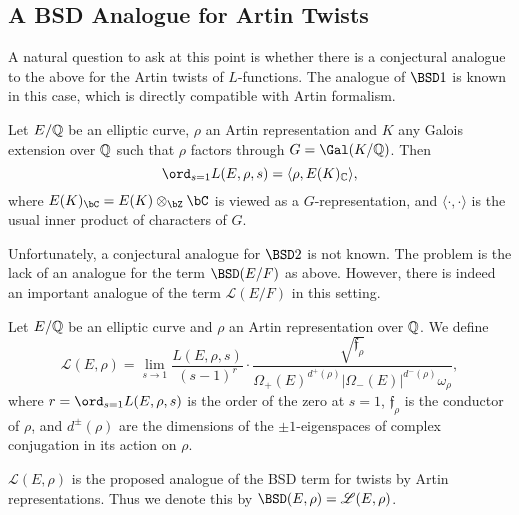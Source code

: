 \subsection{A BSD Analogue for Artin Twists}

A natural question to ask at this point is whether there is a conjectural analogue to the above for the Artin twists of $L$-functions. The analogue of $\BSD1$ is known in this case, which is directly compatible with Artin formalism.

\begin{conj}
    Let $E/\mathbb{Q}$ be an elliptic curve, $\rho$ an Artin representation and $K$ any Galois extension over $\mathbb{Q}$ such that $\rho$ factors through $G=\Gal(K/\QQ)$. Then
    $$\ord_{s=1}L(E,\rho,s)=\langle\rho,E(K)_\CC\rangle,$$
    where $E(K)_{\bC} = E(K) \otimes_{\bZ} \bC$ is viewed as a $G$-representation, and $\langle \cdot, \cdot \rangle$ is the usual inner product of characters of $G$.
\end{conj}

Unfortunately, a conjectural analogue for $\BSD2$ is not known. The problem is the lack of an analogue for the term $\BSD(E/F)$ as above. However, there is indeed an important analogue of the term $\mathcal{L}(E/F)$ in this setting.

\begin{notation}
    Let $E/\mathbb{Q}$ be an elliptic curve and $\rho$ an Artin representation over $\mathbb{Q}$. We define
    $$\mathcal{L}(E,\rho)=\lim_{s\to1}\frac{L(E,\rho,s)}{(s-1)^r}\cdot\frac{\sqrt{\mathfrak{f}_\rho}}{\Omega_+(E)^{d^+(\rho)}|\Omega_-(E)|^{d^-(\rho)}\omega_\rho},$$
    where $r = \ord_{s=1} L(E, \rho, s)$ is the order of the zero at $s = 1$, $\mathfrak{f}_\rho$ is the conductor of $\rho$, and $d^{\pm}(\rho)$ are the dimensions of the $\pm1$-eigenspaces of complex conjugation in its action on $\rho$.
\end{notation}

$\mathcal{L}(E, \rho)$ is the proposed analogue of the BSD term for twists by Artin representations. Thus we denote this by $\BSD(E, \rho) = \mathcal{L}(E, \rho)$. 


